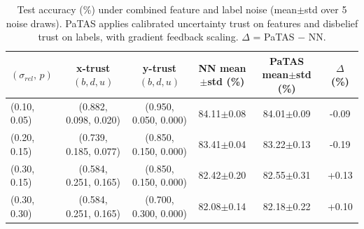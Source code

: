 \begin{table}[ht]
\centering
\caption{Test accuracy (\%) under combined feature and label noise (mean$\pm$std over 5 noise draws). PaTAS applies calibrated uncertainty trust on features and disbelief trust on labels, with gradient feedback scaling. $\Delta$ = PaTAS $-$ NN.}
\label{tab:combined-noise}
\begin{tabular}{lccccc}
\toprule
$(\sigma_{rel},\, p)$ & x-trust $(b,d,u)$ & y-trust $(b,d,u)$ & NN mean$\pm$std (\%) & PaTAS mean$\pm$std (\%) & $\Delta$ (\%) \\
\midrule
(0.10, 0.05) & (0.882, 0.098, 0.020) & (0.950, 0.050, 0.000) & 84.11$\pm$0.08 & 84.01$\pm$0.09 & -0.09 \\
(0.20, 0.15) & (0.739, 0.185, 0.077) & (0.850, 0.150, 0.000) & 83.41$\pm$0.04 & 83.22$\pm$0.13 & -0.19 \\
(0.30, 0.15) & (0.584, 0.251, 0.165) & (0.850, 0.150, 0.000) & 82.42$\pm$0.20 & 82.55$\pm$0.31 & +0.13 \\
(0.30, 0.30) & (0.584, 0.251, 0.165) & (0.700, 0.300, 0.000) & 82.08$\pm$0.14 & 82.18$\pm$0.22 & +0.10 \\
\bottomrule
\end{tabular}
\end{table}